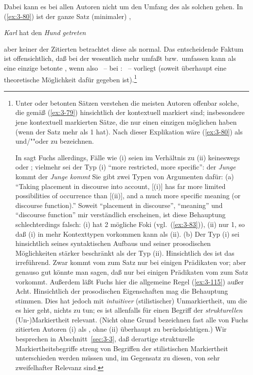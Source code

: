 \documentclass[output=paper]{langsci/langscibook}
\begin{document}
Dabei kann es bei allen Autoren nicht um den Umfang des  als
solchen gehen. In (\ref{ex:3-80}) \zb ist der ganze Satz (minimaler) ,
\begin{exe}
\ex
\label{ex:3-80}
\textit{Karl} hat den \textit{Hund} \textit{getreten}
\end{exe}
aber keiner der Zitierten betrachtet diese  als normal. Das
entscheidende Faktum ist offensichtlich, daß bei  der
 wesentlich mehr umfaßt bzw.\ umfassen kann als eine einzige
betonte , wenn also ~-- bei \citet[301ff]{Fuchs76}:
~-- vorliegt (soweit überhaupt eine theoretische Möglichkeit dafür gegeben
ist).\footnote{\label{fn:3-20}%
  Unter  oder  betonten Sätzen
  verstehen die meisten Autoren offenbar solche, die gemäß (\ref{ex:3-79})
  hinsichtlich der  kontextuell markiert sind; insbesondere jene
  kontextuell markierten Sätze, die nur einen einzigen möglichen 
  haben (wenn der Satz mehr als 1  hat). Nach dieser
  Explikation wäre (\ref{ex:3-80}) als  und/""oder  zu
  bezeichnen.

  In \citet[§2.3]{Fuchs80} sagt Fuchs allerdings, Fälle wie (i)
  seien im Verhältnis zu (ii) keineswegs  oder
  ; vielmehr sei der Typ (i) "`more restricted, more
  specific"':
  \ea
  \label{ex:3-i2}
  der \textit{Junge} kommt
  \ex
  \label{ex:3-ii2}
  der \textit{Junge kommt}
  \z
  Sie gibt zwei Typen von Argumenten dafür: (a) "`Taking placement in
  discourse into account, [(i)] has far more limited possibilities of
  occurrence than [(ii)], and a much more specific mean\-ing (or discourse
  function)."' Soweit "`placement in discourse"', "`mean\-ing"' und "`discourse
  function"' mir verständlich erscheinen, ist diese Behauptung
  schlechterdings falsch: (i) hat 2 mögliche Foki (vgl.\ (\ref{ex:3-83})), (ii) nur
  1, so daß (i) in mehr Kontexttypen vorkommen kann als (ii). (b) Der
  Typ (i) sei hinsichtlich seines syntaktischen Aufbaus und seiner
  prosodischen Möglichkeiten stärker beschränkt als der Typ
  (ii). Hinsichtlich des  ist das
  irreführend. Zwar kommt  vom  zum Satz nur bei
  einigen Prädikaten vor; aber genauso gut könnte man sagen, daß nur bei
  einigen Prädikaten  vom  zum Satz
  vorkommt. Außerdem läßt Fuchs hier die allgemeine Regel (\ref{ex:3-115}) außer
  Acht. Hinsichtlich der prosodischen Eigenschaften mag die Behauptung
  stimmen. Dies hat jedoch mit \textit{intuitiver} (stilistischer)
  Unmarkiertheit, um die es hier geht, nichts zu tun; es ist allenfalls
  für einen Begriff der \textit{strukturellen} (Un-)Markiertheit relevant. (Nicht
  ohne Grund bezeichnen fast alle von Fuchs zitierten Autoren (i) als
  , ohne (ii) überhaupt zu berücksichtigen.) Wir
  besprechen in Abschnitt~\ref{sec:3-3}, daß derartige strukturelle Markiertheitsbegriffe
  streng von Begriffen der stilistischen Markiertheit unterschieden
  werden müssen und, im Gegensatz zu diesen, von sehr zweifelhafter
  Relevanz sind.%
}
\end{document}
